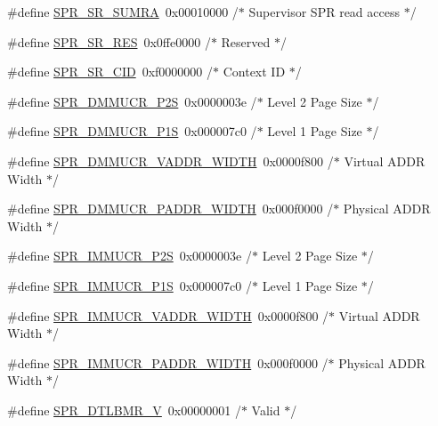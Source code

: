 \begin{DoxyCompactItemize}
\#define \hyperlink{spr-defs_8h_a7cf71a9323fd7509bbdb5d3e71e88840}{\-S\-P\-R\-\_\-\-S\-R\-\_\-\-S\-U\-M\-R\-A}~0x00010000  /$\ast$ Supervisor S\-P\-R read access $\ast$/
\item 
\#define \hyperlink{spr-defs_8h_a44cf478fe917eecf65a8403ac18d8758}{\-S\-P\-R\-\_\-\-S\-R\-\_\-\-R\-E\-S}~0x0ffe0000  /$\ast$ Reserved $\ast$/
\item 
\#define \hyperlink{spr-defs_8h_a096dc749a65a60551e151c94ab58be3d}{\-S\-P\-R\-\_\-\-S\-R\-\_\-\-C\-I\-D}~0xf0000000  /$\ast$ Context I\-D $\ast$/
\item 
\#define \hyperlink{spr-defs_8h_af08c5e4e41150484a54774538cb22486}{\-S\-P\-R\-\_\-\-D\-M\-M\-U\-C\-R\-\_\-\-P2\-S}~0x0000003e  /$\ast$ Level 2 Page Size $\ast$/
\item 
\#define \hyperlink{spr-defs_8h_ab3c7598ecc55357394e7c0d720ea2f29}{\-S\-P\-R\-\_\-\-D\-M\-M\-U\-C\-R\-\_\-\-P1\-S}~0x000007c0  /$\ast$ Level 1 Page Size $\ast$/
\item 
\#define \hyperlink{spr-defs_8h_a5f14b49c2bb07222cc6d06f15db66347}{\-S\-P\-R\-\_\-\-D\-M\-M\-U\-C\-R\-\_\-\-V\-A\-D\-D\-R\-\_\-\-W\-I\-D\-T\-H}~0x0000f800  /$\ast$ Virtual A\-D\-D\-R Width $\ast$/
\item 
\#define \hyperlink{spr-defs_8h_adb041e07a2e5f4b5a6d95a009ee0f24f}{\-S\-P\-R\-\_\-\-D\-M\-M\-U\-C\-R\-\_\-\-P\-A\-D\-D\-R\-\_\-\-W\-I\-D\-T\-H}~0x000f0000  /$\ast$ Physical A\-D\-D\-R Width $\ast$/
\item 
\#define \hyperlink{spr-defs_8h_a751abfaef7a92c053195b37620904b8e}{\-S\-P\-R\-\_\-\-I\-M\-M\-U\-C\-R\-\_\-\-P2\-S}~0x0000003e  /$\ast$ Level 2 Page Size $\ast$/
\item 
\#define \hyperlink{spr-defs_8h_a15cbd4ed39ccbd00f0c3f44cbe07ec3f}{\-S\-P\-R\-\_\-\-I\-M\-M\-U\-C\-R\-\_\-\-P1\-S}~0x000007c0  /$\ast$ Level 1 Page Size $\ast$/
\item 
\#define \hyperlink{spr-defs_8h_a300ba941fc3b1e6eb0822bf7fa06d2e1}{\-S\-P\-R\-\_\-\-I\-M\-M\-U\-C\-R\-\_\-\-V\-A\-D\-D\-R\-\_\-\-W\-I\-D\-T\-H}~0x0000f800  /$\ast$ Virtual A\-D\-D\-R Width $\ast$/
\item 
\#define \hyperlink{spr-defs_8h_af1f3f312e84670e1954b156b96439d40}{\-S\-P\-R\-\_\-\-I\-M\-M\-U\-C\-R\-\_\-\-P\-A\-D\-D\-R\-\_\-\-W\-I\-D\-T\-H}~0x000f0000  /$\ast$ Physical A\-D\-D\-R Width $\ast$/
\item 
\#define \hyperlink{spr-defs_8h_ac98977a8529e329cc071d5b3a3706815}{\-S\-P\-R\-\_\-\-D\-T\-L\-B\-M\-R\-\_\-\-V}~0x00000001  /$\ast$ Valid $\ast$/
\item 

\end{DoxyCompactItemize}
